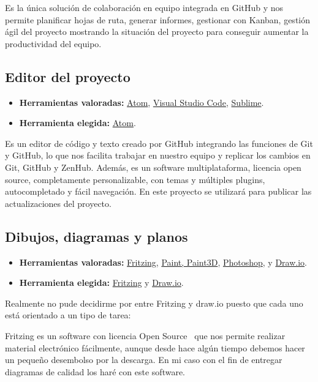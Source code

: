 Es la única solución de colaboración en equipo integrada en GitHub y nos permite planificar hojas de ruta, generar informes, gestionar con Kanban, gestión ágil del proyecto mostrando la situación del proyecto para conseguir aumentar la productividad del equipo.

\subsection{Editor del proyecto}\label{4:ATOM}
\begin{itemize}
    \item \textbf{Herramientas valoradas:} \href{https://atom.io/}{Atom}, \href{https://code.visualstudio.com/}{Visual Studio Code}, \href{https://www.sublimetext.com/}{Sublime}.
    \item \textbf{Herramienta elegida:} \href{https://atom.io/}{Atom}.
\end{itemize}

Es un editor de código y texto creado por GitHub integrando las funciones de Git y GitHub, lo que nos facilita trabajar en nuestro equipo y replicar los cambios en Git, GitHub y ZenHub. Además, es un software multiplataforma, licencia open source, completamente personalizable, con temas y múltiples plugins, autocompletado y fácil navegación.
En este proyecto se utilizará para publicar las actualizaciones del proyecto.



\subsection{Dibujos, diagramas y planos}\label{4:plataformasDibujosYPlanos}
\begin{itemize}
    \item \textbf{Herramientas valoradas:} \href{https://fritzing.org/}{Fritzing}, \href{https://support.microsoft.com/es-es/windows/obtener-microsoft-paint-a6b9578c-ed1c-5b09-0699-4ed8115f9aa9}{Paint, Paint3D}, \href{https://www.adobe.com/es/products/photoshop.html}{Photoshop}, y \href{www.draw.io}{Draw.io}.
    \item \textbf{Herramienta elegida:} \href{https://fritzing.org/}{Fritzing} y \href{www.draw.io}{Draw.io}.
\end{itemize}
Realmente no pude decidirme por entre Fritzing y draw.io puesto que cada uno está orientado a un tipo de tarea:

Fritzing es un software con licencia Open Source~\cite{misc:OpenSource} que nos permite realizar material electrónico fácilmente, aunque desde hace algún tiempo debemos hacer un pequeño desembolso por la descarga. En mi caso con el fin de entregar diagramas de calidad los haré con este software.

